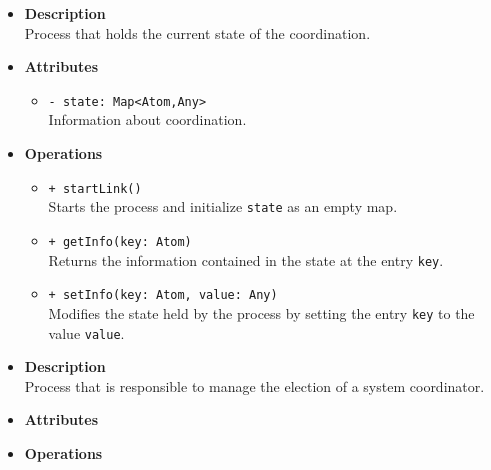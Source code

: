 \FloatBarrier
\begin{itemize}
  \item \textbf{Description} \\
    Process that holds the current state of the coordination.
  \item \textbf{Attributes}
    \begin{itemize}
      \item \texttt{- state: Map<Atom,Any>} \\
    Information about coordination.
    \end{itemize}
  \item \textbf{Operations}
  \begin{itemize}
    \item \texttt{+ startLink()} \\
    Starts the process and initialize \texttt{state} as an empty map.
    \item \texttt{+ getInfo(key: Atom)} \\
    Returns the information contained in the state at the entry \texttt{key}.
    \item \texttt{+ setInfo(key: Atom, value: Any)} \\
    Modifies the state held by the process by setting the entry \texttt{key}
    to the value \texttt{value}.
  \end{itemize}
\end{itemize}

\FloatBarrier
\begin{itemize}
  \item \textbf{Description} \\
    Process that is responsible to manage the election of a system coordinator.
  \item \textbf{Attributes}
  \item \textbf{Operations}
\end{itemize}

